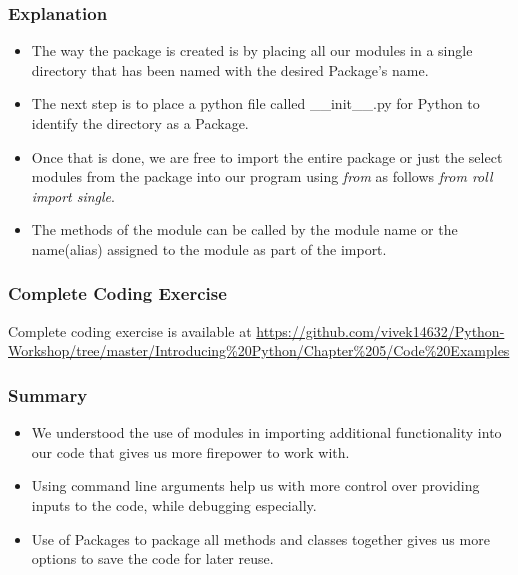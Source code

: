 \documentclass{beamer}
\begin{document}
\begin{frame}
\frametitle{Explanation}
\begin{itemize}
\item The way the package is created is by placing all our modules in a single directory that has been named with the desired Package's name.
\item The next step is to place a python file called \_\_init\_\_.py for Python to identify the directory as a Package.
\item Once that is done, we are free to import the entire package or just the select modules from the package into our program using \textit{from} as follows \textit{from roll import single}.
\item The methods of the module can be called by the module name or the name(alias) assigned to the module as part of the import.
\end{itemize}
\end{frame}


\begin{frame}
\frametitle{Complete Coding Exercise}
Complete coding exercise is available at \url{https://github.com/vivek14632/Python-Workshop/tree/master/Introducing\%20Python/Chapter\%205/Code\%20Examples}
\end{frame}


\begin{frame}
\frametitle{Summary}
\begin{itemize}
\item We understood the use of modules in importing additional functionality into our code that gives us more firepower to work with.
\item Using command line arguments help us with more control over providing inputs to the code, while debugging especially.
\item Use of Packages to package all methods and classes together gives us more options to save the code for later reuse.
\end{itemize}
\end{frame}
\end{document}
